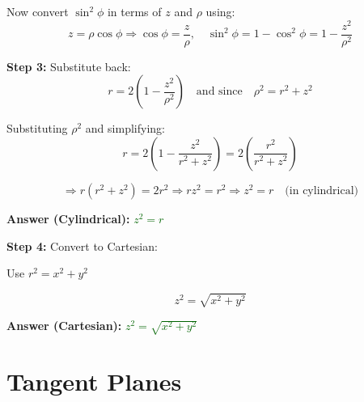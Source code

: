 \documentclass[10pt]{article}                               %
\begin{document}
\begin{adjustwidth}{2em}{0pt}
\begin{adjustwidth}{2em}{0pt}
\begin{examplebox}
\begin{adjustwidth}{2em}{0pt}
                    Now convert \( \sin^2\phi \) in terms of \( z \) and \( \rho \) using:
                    \[
                    z = \rho \cos\phi \Rightarrow \cos\phi = \frac{z}{\rho}, \quad \sin^2\phi = 1 - \cos^2\phi = 1 - \frac{z^2}{\rho^2}
                    \]
                
                    \vspace{0.5em}
                
                    \textbf{Step 3:} Substitute back:
                    \[
                    r = 2\left(1 - \frac{z^2}{\rho^2} \right)
                    \quad \text{and since} \quad \rho^2 = r^2 + z^2
                    \]

                    \break
                
                    Substituting \( \rho^2 \) and simplifying:
                    \[
                    r = 2\left(1 - \frac{z^2}{r^2 + z^2} \right)
                    = 2\left( \frac{r^2}{r^2 + z^2} \right)
                    \]
                
                    \[
                    \Rightarrow r(r^2 + z^2) = 2r^2
                    \Rightarrow r z^2 = r^2
                    \Rightarrow z^2 = r \quad \text{(in cylindrical)}
                    \]
                
                    \vspace{0.5em}
                
                    \textbf{Answer (Cylindrical):} \textcolor{darkgreen}{\( z^2 = r \)}
                
                    \vspace{0.5em}
                
                    \textbf{Step 4:} Convert to Cartesian:
                
                    Use \( r^2 = x^2 + y^2 \)
                
                    \[
                    z^2 = \sqrt{x^2 + y^2}
                    \]
                
                    \vspace{0.5em}
                
                    \textbf{Answer (Cartesian):} \textcolor{darkgreen}{\( z^2 = \sqrt{x^2 + y^2} \)}
                
                \end{adjustwidth}
            
            \end{examplebox}

    \end{adjustwidth}

\end{adjustwidth}

\section*{Tangent Planes}

\begin{adjustwidth}{2em}{0pt}



\end{adjustwidth}
\end{document}

